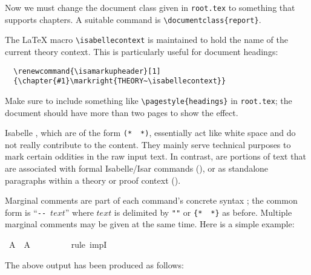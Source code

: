 \begin{isabellebody}
\begin{isamarkuptext}
  \noindent Now we must change the document class given in
  \texttt{root.tex} to something that supports chapters.  A suitable
  command is \verb,\documentclass{report},.

  \medskip The {\LaTeX} macro \verb,\isabellecontext, is maintained to
  hold the name of the current theory context.  This is particularly
  useful for document headings:

\begin{verbatim}
  \renewcommand{\isamarkupheader}[1]
  {\chapter{#1}\markright{THEORY~\isabellecontext}}
\end{verbatim}

  \noindent Make sure to include something like
  \verb,\pagestyle{headings}, in \texttt{root.tex}; the document
  should have more than two pages to show the effect.%
\end{isamarkuptext}%
\isamarkuptrue%
%
\isamarkuptrue%
%
\begin{isamarkuptext}%
Isabelle , which are of the form
  \verb,(,\verb,*,~\isa{{\isasymdots}}~\verb,*,\verb,),, essentially act like
  white space and do not really contribute to the content.  They
  mainly serve technical purposes to mark certain oddities in the raw
  input text.  In contrast,  are portions of
  text that are associated with formal Isabelle/Isar commands
  (), or as standalone paragraphs within a
  theory or proof context ().

  \medskip Marginal comments are part of each command's concrete
  syntax \cite{isabelle-ref}; the common form is ``\verb,--,~$text$''
  where $text$ is delimited by \verb,",\isa{{\isasymdots}}\verb,", or
  \verb,{,\verb,*,~\isa{{\isasymdots}}~\verb,*,\verb,}, as before.  Multiple
  marginal comments may be given at the same time.  Here is a simple
  example:%
\end{isamarkuptext}%
\isamarkuptrue%
\isamarkupfalse%
\ {\isachardoublequoteopen}A\ {\isacharminus}{\isacharminus}{\isachargreater}\ A{\isachardoublequoteclose}\isanewline
\ \ %
\isanewline
\ \ %
\isanewline
%
\isadelimproof
\ \ %
\endisadelimproof
%
\isatagproof
{}\isamarkupfalse%
\ {\isacharparenleft}rule\ impI{\isacharparenright}\ %
%
\endisatagproof
{\isafoldproof}%
%
\isadelimproof
%
\endisadelimproof
%
\begin{isamarkuptext}%
\noindent The above output has been produced as follows:


\end{isamarkuptext}
\end{isabellebody}
